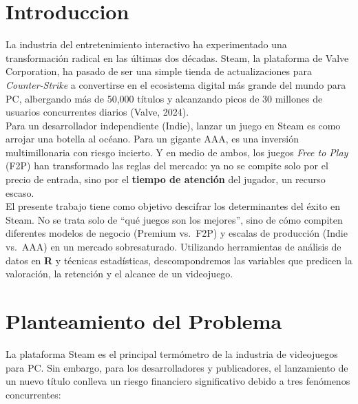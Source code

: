 \documentclass[oneside,11pt]{Latex/Classes/PhDthesisPSnPDF}
\begin{document}
  \cleardoublepage

\mainmatter
\def\baselinestretch{1.5}

\chapter*{Introduccion}

La industria del entretenimiento interactivo ha experimentado una
transformación radical en las últimas dos décadas. Steam, la plataforma
de Valve Corporation, ha pasado de ser una simple tienda de
actualizaciones para \emph{Counter-Strike} a convertirse en el
ecosistema digital más grande del mundo para PC, albergando más de
50,000 títulos y alcanzando picos de 30 millones de usuarios
concurrentes diarios (Valve, 2024).\\

Para un desarrollador independiente (Indie), lanzar un juego en Steam es
como arrojar una botella al océano. Para un gigante AAA, es una
inversión multimillonaria con riesgo incierto. Y en medio de ambos, los
juegos \emph{Free to Play} (F2P) han transformado las reglas del
mercado: ya no se compite solo por el precio de entrada, sino por el
\textbf{tiempo de atención} del jugador, un recurso escaso.\\

El presente trabajo tiene como objetivo descifrar los determinantes del
éxito en Steam. No se trata solo de ``qué juegos son los mejores'', sino
de cómo compiten diferentes modelos de negocio (Premium vs.~F2P) y
escalas de producción (Indie vs.~AAA) en un mercado sobresaturado.
Utilizando herramientas de análisis de datos en \textbf{R} y técnicas
estadísticas, descompondremos las variables que predicen la valoración,
la retención y el alcance de un videojuego.

\chapter{Planteamiento del Problema}

La plataforma Steam es el principal termómetro de la industria de
videojuegos para PC. Sin embargo, para los desarrolladores y
publicadores, el lanzamiento de un nuevo título conlleva un riesgo
financiero significativo debido a tres fenómenos concurrentes:
\end{document}
